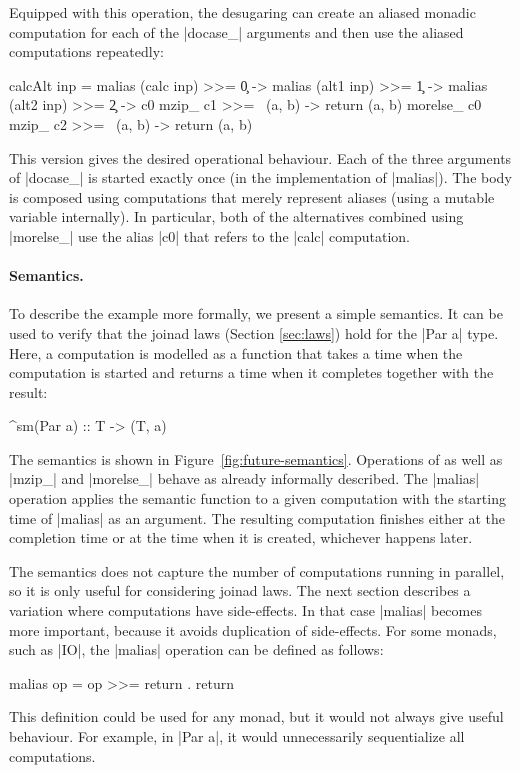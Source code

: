 \documentclass{sigplanconf}
\begin{document}
Equipped with this operation, the desugaring can create an aliased monadic computation for each
of the |docase_| arguments and then use the aliased computations repeatedly:

\begin{code}
calcAlt inp = 
  malias (calc inp) >>= \c0 ->
  malias (alt1 inp) >>= \c1 ->
  malias (alt2 inp) >>= \c2 ->
  c0 mzip_ c1 >>= \ (a, b) -> return (a, b) morelse_
  c0 mzip_ c2 >>= \ (a, b) -> return (a, b)
\end{code}
This version gives the desired operational behaviour. Each of the three arguments of |docase_| 
is started exactly once (in the implementation of |malias|). The body is composed using 
computations that merely represent aliases (using a mutable variable internally). In 
particular, both of the alternatives combined using |morelse_| use the alias |c0| that refers
to the |calc| computation.

\paragraph{Semantics.} To describe the example more formally, we present a simple semantics.
It can be used to verify that the joinad laws (Section \ref{sec:laws}) hold for the |Par a| type. 
Here, a computation is modelled as a function that takes a time when the computation is started and 
returns a time when it completes together with the result:

\begin{code}
^sm(Par a) :: T -> (T, a)
\end{code}
The semantics is shown in Figure~\ref{fig:future-semantics}.
Operations of  as well as |mzip_| and |morelse_| behave as already informally described.
The |malias| operation applies the semantic function to a given computation with the starting 
time of |malias| as an argument. The resulting computation finishes either at 
the completion time or at the time when it is created, whichever happens later.

The semantics does not capture the number of computations running in parallel, so it is only useful for
considering joinad laws. The next section describes a variation where computations have 
side-effects. In that case |malias| becomes more important, because it avoids duplication
of side-effects. For some monads, such as |IO|, the |malias| operation can be defined as follows:

\begin{code}
malias op = op >>= return . return
\end{code}
This definition could be used for any monad, but it would not always give useful behaviour.
For example, in |Par a|, it would unnecessarily sequentialize all computations.
\end{document}
